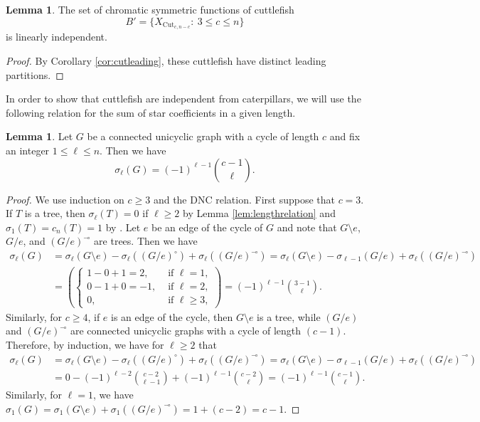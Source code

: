 \documentclass[12pt]{amsart}  %
\theoremstyle{definition}
\newtheorem{lemma}[theorem]{Lemma}
\theoremstyle{remark}
\numberwithin{equation}{section}
\begin{document}
\begin{lemma}\label{lem:cutbasis}
The set of chromatic symmetric functions of cuttlefish
\begin{equation}\label{eq:cutbasis}
B'=\{X_{\text{Cut}_{c,n-c}}: \ 3\leq c\leq n\}
\end{equation}
is linearly independent.
\end{lemma}

\begin{proof}
By Corollary \ref{cor:cutleading}, these cuttlefish have distinct leading partitions.
\end{proof}

In order to show that cuttlefish are independent from caterpillars, we will use the following relation for the sum of star coefficients in a given length.

\begin{lemma}\label{lem:unilength} Let $G$ be a connected unicyclic graph with a cycle of length $c$ and fix an integer $1\leq\ell\leq n$. Then we have
\begin{equation}
\sigma_\ell(G)=(-1)^{\ell-1}\binom{c-1}\ell.
\end{equation}
\end{lemma}

\begin{proof}
We use induction on $c\geq 3$ and the DNC relation. First suppose that $c=3$. If $T$ is a tree, then $\sigma_\ell(T)=0$ if $\ell\geq 2$ by Lemma \ref{lem:lengthrelation} and $\sigma_1(T)=c_n(T)=1$ by \cite[Section 3]{chromstar}. Let $e$ be an edge of the cycle of $G$ and note that $G\setminus e$, $G/e$, and $(G/e)^\multimap$ are trees. Then we have
\begin{align*}
\sigma_\ell(G)&=\sigma_\ell(G\setminus e)-\sigma_\ell((G/e)^\circ)+\sigma_\ell((G/e)^\multimap)=\sigma_\ell(G\setminus e)-\sigma_{\ell-1}(G/e)+\sigma_\ell((G/e)^\multimap)\\\nonumber&=\left(\begin{cases}1-0+1=2,&\text{ if }\ell=1,\\
0-1+0=-1,&\text{ if }\ell=2,\\
0,&\text{ if }\ell\geq 3,\end{cases}\right)=(-1)^{\ell-1}\binom{3-1}\ell.
\end{align*} Similarly, for $c\geq 4$, if $e$ is an edge of the cycle, then $G\setminus e$ is a tree, while $(G/e)$ and $(G/e)^\multimap$ are connected unicyclic graphs with a cycle of length $(c-1)$. Therefore, by induction, we have for $\ell\geq 2$ that
\begin{align*}
\sigma_\ell(G)&=\sigma_\ell(G\setminus e)-\sigma_\ell((G/e)^\circ)+\sigma_\ell((G/e)^\multimap)=\sigma_\ell(G\setminus e)-\sigma_{\ell-1}(G/e)+\sigma_\ell((G/e)^\multimap)\\\nonumber&=0-(-1)^{\ell-2}\binom{c-2}{\ell-1}+(-1)^{\ell-1}\binom{c-2}\ell=(-1)^{\ell-1}\binom{c-1}\ell.
\end{align*}
Similarly, for $\ell=1$, we have $\sigma_1(G)=\sigma_1(G\setminus e)+\sigma_1((G/e)^\multimap)=1+(c-2)=c-1$.
\end{proof}
\end{document}
